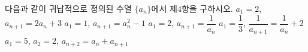 다음과 같이 귀납적으로 정의된 수열 $\{a_n\}$에서 제$4$항을 구하시오. 
 $a_1=2$, $a_{n+1}=2a_n+3$
 $a_1=1$, $a_{n+1}=a_n^2-1$
 $a_1=2$, $a_{n+1}=\dfrac{1}{a_n}$
 $a_1=\dfrac{1}{3}$, $\dfrac{1}{a_{n+1}}=\dfrac{1}{a_n}+2$
 $a_1=5$, $a_2=2$, $a_{n+2}=a_n+a_{n+1}$
